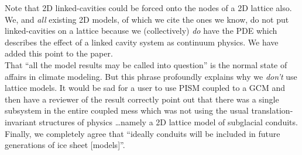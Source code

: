 \documentclass[11pt,reqno]{amsart}
\begin{document}
\begin{itemize}
{\indent Note that 2D linked-cavities could be forced onto the nodes of a 2D lattice also.  We, and \emph{all} existing 2D models, of which we cite the ones we know, do not put linked-cavities on a lattice because we (collectively) \emph{do} have the PDE which describes the effect of a linked cavity system as continuum physics.  We have added this point to the paper. \\
\indent That ``all the model results may be called into question'' is the normal state of affairs in climate modeling.  But this phrase profoundly explains why we \emph{don't} use lattice models.  It would be sad for a user to use PISM coupled to a GCM and then have a reviewer of the result correctly point out that there was a single subsystem in the entire coupled mess which was not using the usual translation-invariant structures of physics \dots namely a 2D lattice model of subglacial conduits.\\
\indent Finally, we completely agree that ``ideally conduits will be included in future
generations of ice sheet [models]''.}


\end{itemize}
\end{document}
